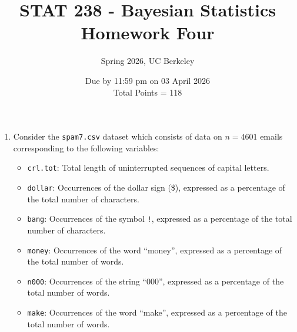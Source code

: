 \documentclass{scrartcl}
\begin{document}
\title{STAT 238 - Bayesian Statistics \\
 Homework Four} 
\subtitle{Spring 2026, UC Berkeley}
\author{Due by 11:59 pm on 03 April 2026 \\ Total Points = 118}

\date{}
\maketitle




\begin{enumerate}

\item Consider the \texttt{spam7.csv} dataset which consists of data
  on $n = 4601$ emails corresponding to the following variables:
  \begin{itemize}
    \item \texttt{crl.tot}: Total length of uninterrupted sequences of capital letters.

    \item \texttt{dollar}: Occurrences of the dollar sign (\$), expressed as a percentage of the total number of characters.

    \item \texttt{bang}: Occurrences of the symbol \texttt{!}, expressed as a percentage of the total number of characters.

    \item \texttt{money}: Occurrences of the word ``money'', expressed as a percentage of the total number of words.

    \item \texttt{n000}: Occurrences of the string ``000'', expressed as a percentage of the total number of words.

    \item \texttt{make}: Occurrences of the word ``make'', expressed as a percentage of the total number of words.


\end{itemize}
\end{enumerate}
\end{document}
